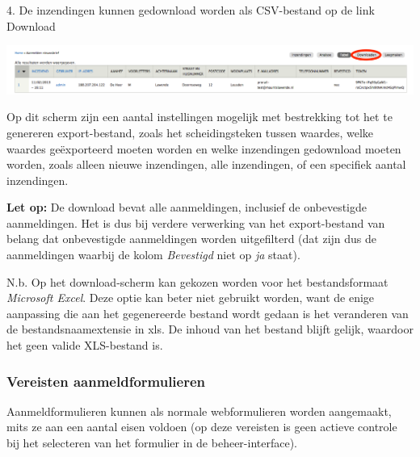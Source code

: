 4. De inzendingen kunnen gedownload worden als CSV-bestand op de link Download
\begin{center}
\includegraphics[width=\textwidth]{img/nieuwsbrief/aanmelden_nieuwsbrief_download.png}
\end{center}

Op dit scherm zijn een aantal instellingen mogelijk met bestrekking tot het te 
genereren export-bestand, zoals het scheidingsteken tussen waardes, welke waardes 
ge\"{e}xporteerd moeten worden en welke inzendingen gedownload moeten worden, zoals 
alleen nieuwe inzendingen, alle inzendingen, of een specifiek aantal inzendingen.

\textbf{Let op:} De download bevat alle aanmeldingen, inclusief de 
onbevestigde aanmeldingen. Het is dus bij verdere verwerking van het 
export-bestand van belang dat onbevestigde aanmeldingen worden uitgefilterd 
(dat zijn dus de aanmeldingen waarbij de kolom \emph{Bevestigd} niet op 
\emph{ja} staat).

N.b. Op het download-scherm kan gekozen worden voor het bestandsformaat 
\emph{Microsoft Excel}. Deze optie kan beter niet gebruikt worden, want de enige 
aanpassing die aan het gegenereerde bestand wordt gedaan is het veranderen van de 
bestandsnaamextensie in 
xls. De inhoud van het bestand blijft gelijk, waardoor het geen valide XLS-bestand is.

\subsubsection{Vereisten aanmeldformulieren}
\label{sec:vereistenaanmeldformulieren}
Aanmeldformulieren kunnen als normale webformulieren worden aangemaakt, mits ze aan 
een aantal eisen voldoen (op deze vereisten is geen actieve controle bij het selecteren 
van het formulier in de beheer-interface).

